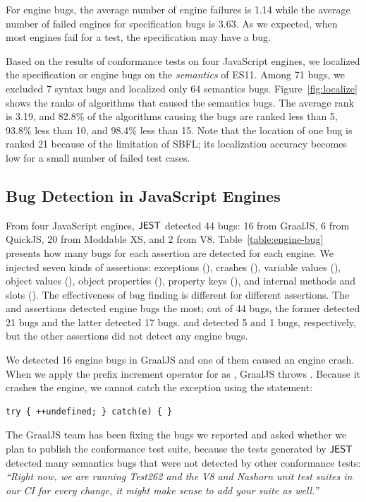 \noindent
For engine bugs, the average number of engine failures is 1.14
while the average number of failed engines for specification bugs is 3.63.
As we expected, when most engines fail for a test, the specification
may have a bug.

Based on the results of conformance tests on four JavaScript engines, we localized
the specification or engine bugs on the \emph{semantics} of ES11.
Among 71 bugs, we excluded 7 syntax bugs and localized only 64 semantics bugs.
Figure~\ref{fig:localize} shows the ranks of algorithms that caused the semantics bugs.
The average rank is 3.19, and 82.8\% of the algorithms causing the
bugs are ranked less than 5, 93.8\% less than 10, and 98.4\% less than 15.
Note that the location of one bug is ranked 21 because of the limitation of SBFL;
its localization accuracy becomes low for a small number of failed test cases.



\subsection{Bug Detection in JavaScript Engines}
From four JavaScript engines, $\tool$ detected 44 bugs:
16 from GraalJS, 6 from QuickJS,
20 from Moddable XS, and 2 from V8.
Table~\ref{table:engine-bug} presents how many bugs for each assertion are detected
for each engine.  We injected seven kinds of assertions: exceptions
(), crashes (), variable values (), object
values (), object properties (), property keys
(), and internal methods and slots ().
The effectiveness of bug finding is different for different assertions.
The  and  assertions detected
engine bugs the most; out of 44 bugs, the former detected 21 bugs
and the latter detected 17 bugs.
 and  detected 5 and 1 bugs, respectively, but the
other assertions did not detect any engine bugs.

We detected 16 engine bugs in GraalJS and one of them caused an engine
crash.  When we apply the prefix increment operator for 
as , GraalJS throws .
Because it crashes the engine, we cannot catch the exception using the
 statement:
\begin{lstlisting}[style=myJSstyle]
    try { ++undefined; } catch(e) { }
\end{lstlisting}
The GraalJS team has been fixing the bugs we reported and
asked whether we plan to publish the conformance test suite,
because the tests generated by $\tool$ detected many semantics bugs that
were not detected by other conformance tests:
\emph{``Right now, we are running Test262 and the V8 and Nashorn
unit test suites in our CI for every change, it might make sense to
add your suite as well.''}

